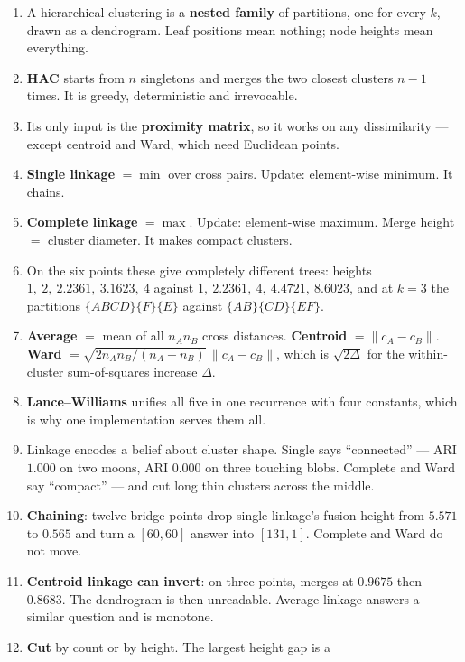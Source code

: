 \documentclass[11pt]{article}
\begin{document}
\begin{enumerate}[leftmargin=*]
  \item A hierarchical clustering is a \textbf{nested family} of partitions,
    one for every $k$, drawn as a dendrogram. Leaf positions mean nothing;
    node heights mean everything.
  \item \textbf{HAC} starts from $n$ singletons and merges the two closest
    clusters $n-1$ times. It is greedy, deterministic and irrevocable.
  \item Its only input is the \textbf{proximity matrix}, so it works on any
    dissimilarity --- except centroid and Ward, which need Euclidean points.
  \item \textbf{Single linkage} $= \min$ over cross pairs. Update: element-wise
    minimum. It chains.
  \item \textbf{Complete linkage} $= \max$. Update: element-wise maximum. Merge
    height $=$ cluster diameter. It makes compact clusters.
  \item On the six points these give completely different trees: heights
    $1,\ 2,\ 2.2361,\ 3.1623,\ 4$ against
    $1,\ 2.2361,\ 4,\ 4.4721,\ 8.6023$, and at $k=3$ the partitions
    $\{ABCD\}\{F\}\{E\}$ against $\{AB\}\{CD\}\{EF\}$.
  \item \textbf{Average} $=$ mean of all $n_A n_B$ cross distances.
    \textbf{Centroid} $= \lVert c_A - c_B\rVert$. \textbf{Ward} $=
    \sqrt{2 n_A n_B/(n_A{+}n_B)}\,\lVert c_A - c_B\rVert$, which is
    $\sqrt{2\Delta}$ for the within-cluster sum-of-squares increase $\Delta$.
  \item \textbf{Lance--Williams} unifies all five in one recurrence with four
    constants, which is why one implementation serves them all.
  \item Linkage encodes a belief about cluster shape. Single says
    ``connected'' --- ARI $1.000$ on two moons, ARI $0.000$ on three touching
    blobs. Complete and Ward say ``compact'' --- and cut long thin clusters
    across the middle.
  \item \textbf{Chaining}: twelve bridge points drop single linkage's fusion
    height from $5.571$ to $0.565$ and turn a $[60,60]$ answer into
    $[131,1]$. Complete and Ward do not move.
  \item \textbf{Centroid linkage can invert}: on three points, merges at
    $0.9675$ then $0.8683$. The dendrogram is then unreadable. Average
    linkage answers a similar question and is monotone.
  \item \textbf{Cut} by count or by height. The largest height gap is a

\end{enumerate}
\end{document}

